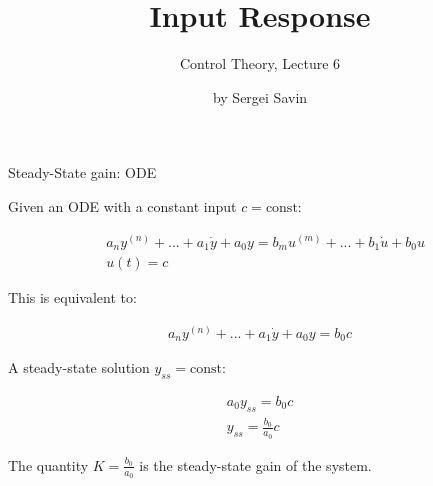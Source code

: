\documentclass{beamer}
\title{Input Response}
\subtitle{Control Theory, Lecture 6}
\author{by Sergei Savin}
\date{\mydate}
\begin{document}
\maketitle


%
%




\begin{frame}{Steady-State gain: ODE}
	\begin{flushleft}
		
		Given an ODE with a constant input $c = \text{const}$:
		
		\begin{align}
			&a_n y^{(n)} + ... + a_1 \dot y  + a_0 y = b_m u^{(m )}+ ... + b_1 \dot u + b_0 u
			\\
			&u(t) = c 
		\end{align}
		
		This is equivalent to:
		
		\begin{align}
			a_n y^{(n)} + ... + a_1 \dot y  + a_0 y =  b_0 c
		\end{align}
		
		A steady-state solution $y_{ss} = \text{const}$:
		
		\begin{align}
			a_0 y_{ss}  =  b_0 c \\
			y_{ss} = \frac{b_0}{a_0} c
		\end{align}
		
		The quantity $K = \frac{b_0}{a_0}$ is the steady-state gain of the system.
		
	\end{flushleft}
\end{frame}
\end{document}
